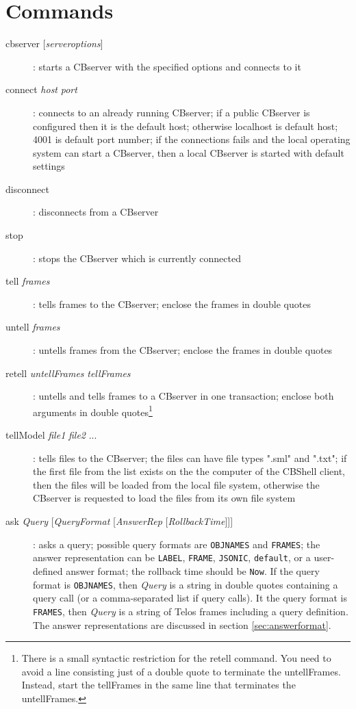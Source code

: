 \section{Commands}


\begin{description}


\item[{cbserver [{\it serveroptions}]}] :
      starts a CBserver with the specified options and connects to it

\item[connect {\it host} {\it port}] :
      connects to an already running CBserver;
      if a public CBserver is configured then it is the default host; otherwise localhost is default host;
      4001 is default port number; if the connections fails and the local operating system can start
      a CBserver, then a local CBserver is started with default settings

\item[disconnect] :
      disconnects from a CBserver

\item[stop] :
      stops the CBserver which is currently connected

\item[tell {\it frames}] :
      tells frames to the CBserver; enclose the frames in double quotes

\item[untell {\it frames}] :
      untells frames from the CBserver; enclose the frames in double quotes

\item[retell {\it untellFrames} {\it tellFrames}] :
      untells and tells frames to a CBserver in one transaction; enclose both arguments in
      double quotes\footnote{There is a small syntactic restriction for the retell
      command. You need to avoid a line consisting just of a double quote to terminate the untellFrames.
      Instead, start the tellFrames in the same line that terminates the untellFrames.}

\item[tellModel {\it file1} {\it file2} ...] :
      tells files to the CBserver; the files can have file types ".sml" and ".txt";
      if the first file from the list exists on the the computer of the CBShell client, then 
      the files will be loaded from the local file system, 
      otherwise the CBserver is requested to load the files from its
      own file system

\item[ask {\it Query} {[{\it QueryFormat} [{\it AnswerRep} [{\it RollbackTime}]]]}] :
      asks a query; possible query formats are {\tt OBJNAMES} and {\tt FRAMES};
      the answer representation can
      be {\tt LABEL}, {\tt FRAME}, {\tt JSONIC}, {\tt default}, or a user-defined answer format; the rollback
      time should be
      {\tt Now}. If the query format is {\tt OBJNAMES}, then {\it Query} is a string
      in double quotes containing a
      query call (or a comma-separated list if query calls). It the query format is {\tt FRAMES},
      then {\it Query} is a string of Telos frames including a query definition.
      The answer representations are discussed in section \ref{sec:answerformat}.


\end{description}
